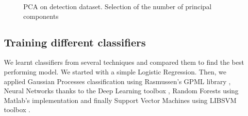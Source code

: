 \documentclass[10pt,a4paper]{article}
\begin{document}
   \begin{figure}[ht]
       \center
    	\hfill
	\caption{PCA on detection dataset. Selection of the number of principal components}
  \end{figure}

  \subsection{Training different classifiers}
  We learnt classifiers from several techniques and compared them to find the best performing model. We started with a simple Logistic Regression. Then, we applied Gaussian Processes classification using Rasmussen's GPML library \cite{gpmltoolbox},  Neural Networks thanks to the Deep Learning toolbox \cite{deeplearningtoolbox}, Random Forests using Matlab's implementation and finally Support Vector Machines using LIBSVM toolbox \cite{libsvmtoolbox}.\\
\end{document}
